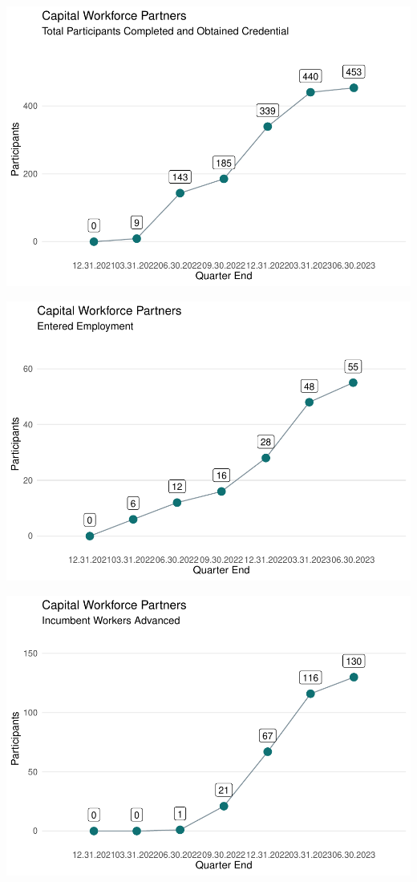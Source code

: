 \documentclass[
  landscape, table]{article}
\begin{document}
\includegraphics{ow_pdf_by_grantee_files/figure-latex/unnamed-chunk-7-1.pdf}

\includegraphics{ow_pdf_by_grantee_files/figure-latex/unnamed-chunk-8-1.pdf}

\includegraphics{ow_pdf_by_grantee_files/figure-latex/unnamed-chunk-9-1.pdf}
\end{document}
